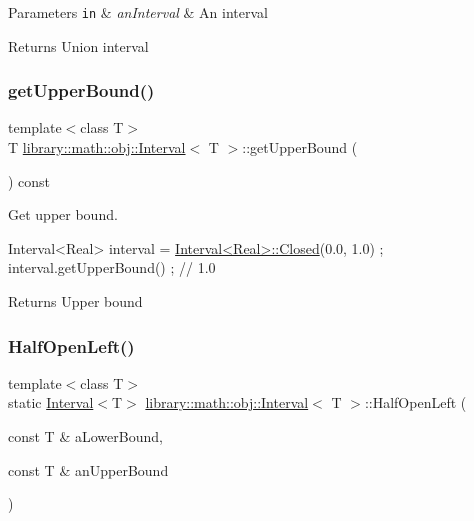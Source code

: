 \begin{DoxyParams}[1]{Parameters}
\mbox{\tt in}  & {\em an\+Interval} & An interval \\
\hline
\end{DoxyParams}
\begin{DoxyReturn}{Returns}
Union interval 
\end{DoxyReturn}
\mbox{\label{classlibrary_1_1math_1_1obj_1_1_interval_a97d09e9c5e7f67b6ddf162af01a8066e}} 
\subsubsection{\texorpdfstring{get\+Upper\+Bound()}{getUpperBound()}}
{\footnotesize\ttfamily template$<$class T$>$ \\
T \hyperlink{classlibrary_1_1math_1_1obj_1_1_interval}{library\+::math\+::obj\+::\+Interval}$<$ T $>$\+::get\+Upper\+Bound (\begin{DoxyParamCaption}{ }\end{DoxyParamCaption}) const}



Get upper bound. 


\begin{DoxyCode}
Interval<Real> interval = \hyperlink{classlibrary_1_1math_1_1obj_1_1_interval_aae8bb2b89af450729338d48563def4d7}{Interval<Real>::Closed}(0.0, 1.0) ;
interval.getUpperBound() ; \textcolor{comment}{// 1.0}
\end{DoxyCode}


\begin{DoxyReturn}{Returns}
Upper bound 
\end{DoxyReturn}
\mbox{\label{classlibrary_1_1math_1_1obj_1_1_interval_a7e706c1e5133c731645e7633a9d763bd}} 
\subsubsection{\texorpdfstring{Half\+Open\+Left()}{HalfOpenLeft()}}
{\footnotesize\ttfamily template$<$class T$>$ \\
static \hyperlink{classlibrary_1_1math_1_1obj_1_1_interval}{Interval}$<$T$>$ \hyperlink{classlibrary_1_1math_1_1obj_1_1_interval}{library\+::math\+::obj\+::\+Interval}$<$ T $>$\+::Half\+Open\+Left (\begin{DoxyParamCaption}\item[{const T \&}]{a\+Lower\+Bound,  }\item[{const T \&}]{an\+Upper\+Bound }\end{DoxyParamCaption})\hspace{0.3cm}{\ttfamily [static]}}



